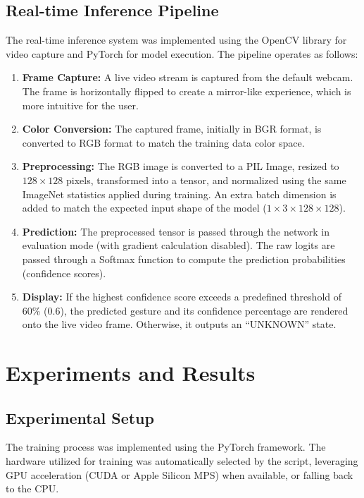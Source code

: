 \documentclass[conference]{IEEEtran}
\begin{document}
\subsection{Real-time Inference Pipeline}
The real-time inference system was implemented using the OpenCV library for video capture and PyTorch for model execution. The pipeline operates as follows:
\begin{enumerate}
    \item \textbf{Frame Capture:} A live video stream is captured from the default webcam. The frame is horizontally flipped to create a mirror-like experience, which is more intuitive for the user.
    \item \textbf{Color Conversion:} The captured frame, initially in BGR format, is converted to RGB format to match the training data color space.
    \item \textbf{Preprocessing:} The RGB image is converted to a PIL Image, resized to $128 \times 128$ pixels, transformed into a tensor, and normalized using the same ImageNet statistics applied during training. An extra batch dimension is added to match the expected input shape of the model ($1 \times 3 \times 128 \times 128$).
    \item \textbf{Prediction:} The preprocessed tensor is passed through the network in evaluation mode (with gradient calculation disabled). The raw logits are passed through a Softmax function to compute the prediction probabilities (confidence scores).
    \item \textbf{Display:} If the highest confidence score exceeds a predefined threshold of 60\% (0.6), the predicted gesture and its confidence percentage are rendered onto the live video frame. Otherwise, it outputs an ``UNKNOWN'' state.
\end{enumerate}

\section{Experiments and Results}

\subsection{Experimental Setup}
The training process was implemented using the PyTorch framework. The hardware utilized for training was automatically selected by the script, leveraging GPU acceleration (CUDA or Apple Silicon MPS) when available, or falling back to the CPU. 
\end{document}
